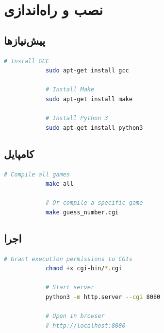 \documentclass[12pt,a4paper]{article}
\begin{document}
	\appendix
	
	
	\newpage
	\section{نصب و راه‌اندازی}
	
	\subsection{پیش‌نیازها}
	\begin{latin}
		\begin{lstlisting}[language=bash]
			# Install GCC
			sudo apt-get install gcc
			
			# Install Make
			sudo apt-get install make
			
			# Install Python 3
			sudo apt-get install python3
		\end{lstlisting}
	\end{latin}
	
	\subsection{کامپایل}
	\begin{latin}
		\begin{lstlisting}[language=bash]
			# Compile all games
			make all
			
			# Or compile a specific game
			make guess_number.cgi
		\end{lstlisting}
	\end{latin}
	
	\subsection{اجرا}
	\begin{latin}
		\begin{lstlisting}[language=bash]
			# Grant execution permissions to CGIs
			chmod +x cgi-bin/*.cgi
			
			# Start server
			python3 -m http.server --cgi 8080
			
			# Open in browser
			# http://localhost:8080
		\end{lstlisting}
	\end{latin}
	
\end{document}

